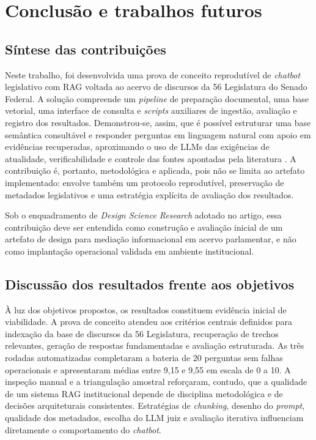 \section{Conclusão e trabalhos futuros}

\subsection{Síntese das contribuições}

Neste trabalho, foi desenvolvida uma prova de conceito reprodutível de \textit{chatbot} legislativo com RAG voltada ao acervo de discursos da 56\textordfeminine{} Legislatura do Senado Federal. A solução compreende um \textit{pipeline} de preparação documental, uma base vetorial, uma interface de consulta e \textit{scripts} auxiliares de ingestão, avaliação e registro dos resultados. Demonstrou-se, assim, que é possível estruturar uma base semântica consultável e responder perguntas em linguagem natural com apoio em evidências recuperadas, aproximando o uso de LLMs das exigências de atualidade, verificabilidade e controle das fontes apontadas pela literatura \parencite{gao2023ragSurvey}. A contribuição é, portanto, metodológica e aplicada, pois não se limita ao artefato implementado: envolve também um protocolo reprodutível, preservação de metadados legislativos e uma estratégia explícita de avaliação dos resultados.

Sob o enquadramento de \textit{Design Science Research} adotado no artigo, essa contribuição deve ser entendida como construção e avaliação inicial de um artefato de design para mediação informacional em acervo parlamentar, e não como implantação operacional validada em ambiente institucional.

\subsection{Discussão dos resultados frente aos objetivos}

À luz dos objetivos propostos, os resultados constituem evidência inicial de viabilidade. A prova de conceito atendeu aos critérios centrais definidos para indexação da base de discursos da 56\textordfeminine{} Legislatura, recuperação de trechos relevantes, geração de respostas fundamentadas e avaliação estruturada. As três rodadas automatizadas completaram a bateria de 20 perguntas sem falhas operacionais e apresentaram médias entre 9,15 e 9,55 em escala de 0 a 10. A inspeção manual e a triangulação amostral reforçaram, contudo, que a qualidade de um sistema RAG institucional depende de disciplina metodológica e de decisões arquiteturais consistentes. Estratégias de \textit{chunking}, desenho do \textit{prompt}, qualidade dos metadados, escolha do LLM juiz e avaliação iterativa influenciam diretamente o comportamento do \textit{chatbot}.

